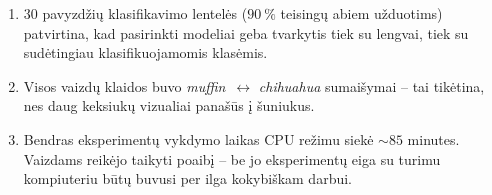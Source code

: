 \begin{enumerate}
    \item $30$ pavyzdžių klasifikavimo lentelės ($90\ \%$ teisingų abiem užduotims) patvirtina, kad pasirinkti modeliai geba tvarkytis tiek su lengvai, tiek su sudėtingiau klasifikuojamomis klasėmis.
    
    \item Visos vaizdų klaidos buvo \textit{muffin}~$\leftrightarrow$ \textit{chihuahua} sumaišymai – tai tikėtina, nes daug keksiukų vizualiai panašūs į šuniukus.
    
    \item Bendras eksperimentų vykdymo laikas CPU režimu siekė $\sim85$ minutes. Vaizdams reikėjo taikyti poaibį – be jo eksperimentų eiga su turimu kompiuteriu būtų buvusi per ilga kokybiškam darbui.
\end{enumerate}